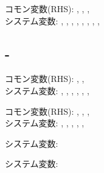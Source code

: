 \begin{hosoku}\small
コモン変数(RHS): , , , \\
システム変数: , , , , , , , , 
\end{hosoku}

\subsection{-}
\begin{hosoku}\small
コモン変数(RHS): , , \\
システム変数: , , , , , , 
\end{hosoku}

\begin{hosoku}\small
コモン変数(RHS): , , , \\
システム変数: , , , , , 
\end{hosoku}

\begin{hosoku}\small
システム変数: 
\end{hosoku}

\begin{hosoku}\small
システム変数: 
\end{hosoku}

